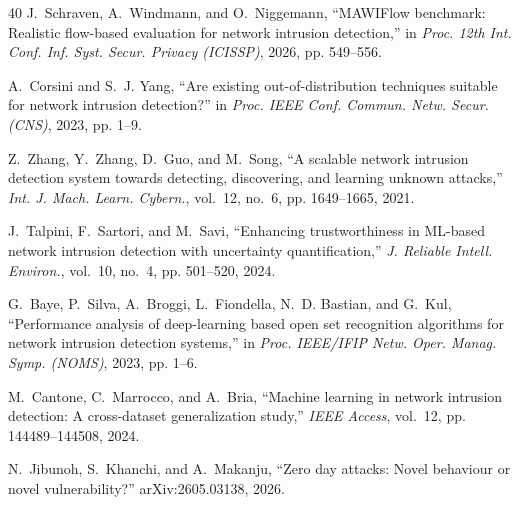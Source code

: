 \begin{thebibliography}{40}
J.~Schraven, A.~Windmann, and O.~Niggemann, ``MAWIFlow benchmark: Realistic flow-based evaluation for network intrusion detection,'' in \emph{Proc. 12th Int. Conf. Inf. Syst. Secur. Privacy (ICISSP)}, 2026, pp. 549--556.

A.~Corsini and S.~J. Yang, ``Are existing out-of-distribution techniques suitable for network intrusion detection?'' in \emph{Proc. IEEE Conf. Commun. Netw. Secur. (CNS)}, 2023, pp. 1--9.

Z.~Zhang, Y.~Zhang, D.~Guo, and M.~Song, ``A scalable network intrusion detection system towards detecting, discovering, and learning unknown attacks,'' \emph{Int. J. Mach. Learn. Cybern.}, vol.~12, no.~6, pp. 1649--1665, 2021.

J.~Talpini, F.~Sartori, and M.~Savi, ``Enhancing trustworthiness in ML-based network intrusion detection with uncertainty quantification,'' \emph{J. Reliable Intell. Environ.}, vol.~10, no.~4, pp. 501--520, 2024.

G.~Baye, P.~Silva, A.~Broggi, L.~Fiondella, N.~D. Bastian, and G.~Kul, ``Performance analysis of deep-learning based open set recognition algorithms for network intrusion detection systems,'' in \emph{Proc. IEEE/IFIP Netw. Oper. Manag. Symp. (NOMS)}, 2023, pp. 1--6.

M.~Cantone, C.~Marrocco, and A.~Bria, ``Machine learning in network intrusion detection: A cross-dataset generalization study,'' \emph{IEEE Access}, vol.~12, pp. 144489--144508, 2024.

N.~Jibunoh, S.~Khanchi, and A.~Makanju, ``Zero day attacks: Novel behaviour or novel vulnerability?'' arXiv:2605.03138, 2026.

\end{thebibliography}